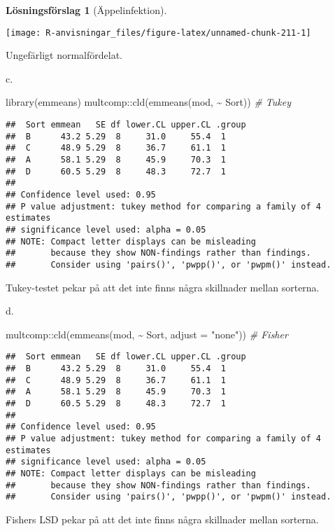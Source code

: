\documentclass[
]{book}
\newenvironment{Shaded}{\begin{snugshade}}{\end{snugshade}}
\newcommand{\AttributeTok}[1]{\textcolor[rgb]{0.77,0.63,0.00}{#1}}
\newcommand{\CommentTok}[1]{\textcolor[rgb]{0.56,0.35,0.01}{\textit{#1}}}
\newcommand{\FunctionTok}[1]{\textcolor[rgb]{0.00,0.00,0.00}{#1}}
\newcommand{\NormalTok}[1]{#1}
\newcommand{\SpecialCharTok}[1]{\textcolor[rgb]{0.00,0.00,0.00}{#1}}
\newcommand{\StringTok}[1]{\textcolor[rgb]{0.31,0.60,0.02}{#1}}
\theoremstyle{definition}
\theoremstyle{definition}
\theoremstyle{definition}
\theoremstyle{definition}
\newtheorem{hypothesis}{Lösningsförslag}[chapter]
\theoremstyle{remark}
\begin{document}
\begin{hypothesis}[Äppelinfektion]
\begin{center}\texttt{[image: R-anvisningar\_files/figure-latex/unnamed-chunk-211-1]} \end{center}

Ungefärligt normalfördelat.

c.

\begin{Shaded}
\begin{Highlighting}[]
\FunctionTok{library}\NormalTok{(emmeans)}
\NormalTok{multcomp}\SpecialCharTok{::}\FunctionTok{cld}\NormalTok{(}\FunctionTok{emmeans}\NormalTok{(mod, }\SpecialCharTok{\textasciitilde{}}\NormalTok{ Sort)) }\CommentTok{\# Tukey}
\end{Highlighting}
\end{Shaded}

\begin{verbatim}
##  Sort emmean   SE df lower.CL upper.CL .group
##  B      43.2 5.29  8     31.0     55.4  1    
##  C      48.9 5.29  8     36.7     61.1  1    
##  A      58.1 5.29  8     45.9     70.3  1    
##  D      60.5 5.29  8     48.3     72.7  1    
## 
## Confidence level used: 0.95 
## P value adjustment: tukey method for comparing a family of 4 estimates 
## significance level used: alpha = 0.05 
## NOTE: Compact letter displays can be misleading
##       because they show NON-findings rather than findings.
##       Consider using 'pairs()', 'pwpp()', or 'pwpm()' instead.
\end{verbatim}

Tukey-testet pekar på att det inte finns några skillnader mellan sorterna.

d.

\begin{Shaded}
\begin{Highlighting}[]
\NormalTok{multcomp}\SpecialCharTok{::}\FunctionTok{cld}\NormalTok{(}\FunctionTok{emmeans}\NormalTok{(mod, }\SpecialCharTok{\textasciitilde{}}\NormalTok{ Sort, }\AttributeTok{adjust =} \StringTok{"none"}\NormalTok{)) }\CommentTok{\# Fisher}
\end{Highlighting}
\end{Shaded}

\begin{verbatim}
##  Sort emmean   SE df lower.CL upper.CL .group
##  B      43.2 5.29  8     31.0     55.4  1    
##  C      48.9 5.29  8     36.7     61.1  1    
##  A      58.1 5.29  8     45.9     70.3  1    
##  D      60.5 5.29  8     48.3     72.7  1    
## 
## Confidence level used: 0.95 
## P value adjustment: tukey method for comparing a family of 4 estimates 
## significance level used: alpha = 0.05 
## NOTE: Compact letter displays can be misleading
##       because they show NON-findings rather than findings.
##       Consider using 'pairs()', 'pwpp()', or 'pwpm()' instead.
\end{verbatim}

Fishers LSD pekar på att det inte finns några skillnader mellan sorterna.
\end{hypothesis}
\end{document}
